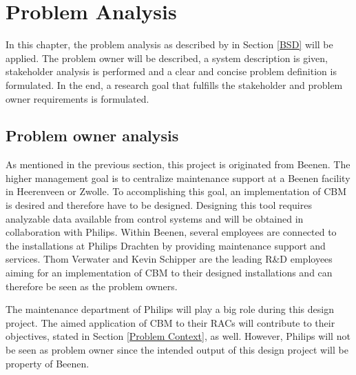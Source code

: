 
\chapter{Problem Analysis} %

\label{Chapter2} %
In this chapter, the problem analysis as described by \citet{Prins2008} in Section \ref{BSD} will be applied. The problem owner will be described, a system description is given, stakeholder analysis is performed and a clear and concise problem definition is formulated. In the end, a research goal that fulfills the stakeholder and problem owner requirements is formulated.

\section{Problem owner analysis} \label{Problem owner analysis}
As mentioned in the previous section, this project is originated from Beenen. The higher management goal is to centralize maintenance support at a Beenen facility in Heerenveen or Zwolle. To accomplishing this goal, an implementation of CBM is desired and therefore have to be designed. Designing this tool requires analyzable data available from control systems and will be obtained in collaboration with Philips. Within Beenen, several employees are connected to the installations at Philips Drachten by providing maintenance support and services. Thom Verwater and Kevin Schipper are the leading R\&D employees aiming for an implementation of CBM to their designed installations and can therefore be seen as the problem owners. 

The maintenance department of Philips will play a big role during this design project. The aimed application of CBM to their RACs will contribute to their objectives, stated in Section \ref{Problem Context}, as well. However, Philips will not be seen as problem owner since the intended output of this design project will be property of Beenen. 

